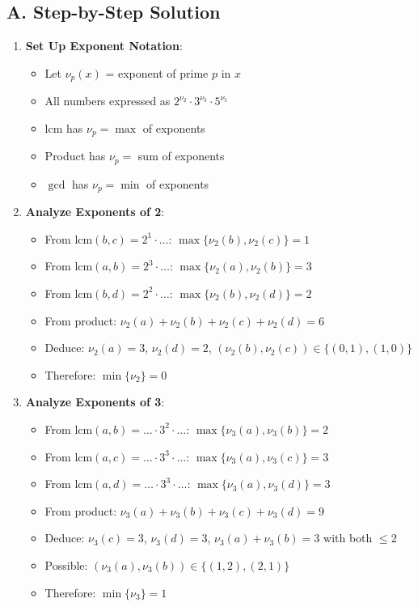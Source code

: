 \documentclass[12pt]{article}
\begin{document}
\begin{solutionbox}
\subsection*{A. Step-by-Step Solution}
\begin{enumerate}[leftmargin=*]
    \item \textbf{Set Up Exponent Notation}: 
    \begin{itemize}
        \item Let $\nu_p(x)$ = exponent of prime $p$ in $x$
        \item All numbers expressed as $2^{\nu_2} \cdot 3^{\nu_3} \cdot 5^{\nu_5}$
        \item $\text{lcm}$ has $\nu_p = \max$ of exponents
        \item Product has $\nu_p = $ sum of exponents
        \item $\gcd$ has $\nu_p = \min$ of exponents
    \end{itemize}
    
    \item \textbf{Analyze Exponents of 2}: 
    \begin{itemize}
        \item From $\text{lcm}(b,c) = 2^1 \cdot \ldots$: $\max\{\nu_2(b), \nu_2(c)\} = 1$
        \item From $\text{lcm}(a,b) = 2^3 \cdot \ldots$: $\max\{\nu_2(a), \nu_2(b)\} = 3$
        \item From $\text{lcm}(b,d) = 2^2 \cdot \ldots$: $\max\{\nu_2(b), \nu_2(d)\} = 2$
        \item From product: $\nu_2(a) + \nu_2(b) + \nu_2(c) + \nu_2(d) = 6$
        \item Deduce: $\nu_2(a) = 3$, $\nu_2(d) = 2$, $(\nu_2(b), \nu_2(c)) \in \{(0,1), (1,0)\}$
        \item Therefore: $\min\{\nu_2\} = 0$
    \end{itemize}
    
    \item \textbf{Analyze Exponents of 3}: 
    \begin{itemize}
        \item From $\text{lcm}(a,b) = \ldots \cdot 3^2 \cdot \ldots$: $\max\{\nu_3(a), \nu_3(b)\} = 2$
        \item From $\text{lcm}(a,c) = \ldots \cdot 3^3 \cdot \ldots$: $\max\{\nu_3(a), \nu_3(c)\} = 3$
        \item From $\text{lcm}(a,d) = \ldots \cdot 3^3 \cdot \ldots$: $\max\{\nu_3(a), \nu_3(d)\} = 3$
        \item From product: $\nu_3(a) + \nu_3(b) + \nu_3(c) + \nu_3(d) = 9$
        \item Deduce: $\nu_3(c) = 3$, $\nu_3(d) = 3$, $\nu_3(a) + \nu_3(b) = 3$ with both $\leq 2$
        \item Possible: $(\nu_3(a), \nu_3(b)) \in \{(1,2), (2,1)\}$
        \item Therefore: $\min\{\nu_3\} = 1$
    \end{itemize}
    

\end{enumerate}
\end{solutionbox}
\end{document}
